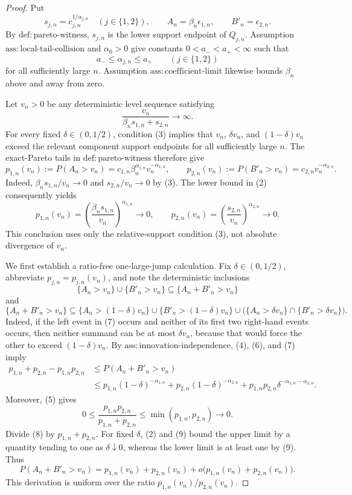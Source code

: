\documentclass{article}
\begin{document}
\begin{proof}
Put
\[
s_{j,n}=c_{j,n}^{1/\alpha_{j,n}}\quad(j\in\{1,2\}),
\qquad A_n=\beta_n\epsilon_{1,n},
\qquad B'_n=\epsilon_{2,n}.
\tag{1}
\]
By \(\mathrm{def{:}pareto\text{-}witness}\), \(s_{j,n}\) is the lower support endpoint of \(Q_{j,n}\). Assumption \(\mathrm{ass{:}local\text{-}tail\text{-}collision}\) and \(\alpha_0>0\) give constants \(0<a_-<a_+<\infty\) such that
\[
a_-\leq\alpha_{j,n}\leq a_+
\qquad(j\in\{1,2\})
\tag{2}
\]
for all sufficiently large \(n\). Assumption \(\mathrm{ass{:}coefficient\text{-}limit}\) likewise bounds \(\beta_n\) above and away from zero.

Let \(v_n>0\) be any deterministic level sequence satisfying
\[
\frac{v_n}{\beta_ns_{1,n}+s_{2,n}}\to\infty.
\tag{3}
\]
For every fixed \(\delta\in(0,1/2)\), condition (3) implies that \(v_n\), \(\delta v_n\), and \((1-\delta)v_n\) exceed the relevant component support endpoints for all sufficiently large \(n\). The exact-Pareto tails in \(\mathrm{def{:}pareto\text{-}witness}\) therefore give
\[
p_{1,n}(v_n):=P(A_n>v_n)
=c_{1,n}\beta_n^{\alpha_{1,n}}v_n^{-\alpha_{1,n}},
\qquad
p_{2,n}(v_n):=P(B'_n>v_n)
=c_{2,n}v_n^{-\alpha_{2,n}}.
\tag{4}
\]
Indeed, \(\beta_ns_{1,n}/v_n\to0\) and \(s_{2,n}/v_n\to0\) by (3). The lower bound in (2) consequently yields
\[
p_{1,n}(v_n)=\left(\frac{\beta_ns_{1,n}}{v_n}\right)^{\alpha_{1,n}}\to0,
\qquad
p_{2,n}(v_n)=\left(\frac{s_{2,n}}{v_n}\right)^{\alpha_{2,n}}\to0.
\tag{5}
\]
This conclusion uses only the relative-support condition (3), not absolute divergence of \(v_n\).

We first establish a ratio-free one-large-jump calculation. Fix \(\delta\in(0,1/2)\), abbreviate \(p_{j,n}=p_{j,n}(v_n)\), and note the deterministic inclusions
\[
\{A_n>v_n\}\cup\{B'_n>v_n\}
\subseteq\{A_n+B'_n>v_n\}
\tag{6}
\]
and
\[
\{A_n+B'_n>v_n\}
\subseteq
\{A_n>(1-\delta)v_n\}\cup\{B'_n>(1-\delta)v_n\}
\cup\bigl(\{A_n>\delta v_n\}\cap\{B'_n>\delta v_n\}\bigr).
\tag{7}
\]
Indeed, if the left event in (7) occurs and neither of its first two right-hand events occurs, then neither summand can be at most \(\delta v_n\), because that would force the other to exceed \((1-\delta)v_n\). By \(\mathrm{ass{:}innovation\text{-}independence}\), (4), (6), and (7) imply
\[
\begin{split}
p_{1,n}+p_{2,n}-p_{1,n}p_{2,n}
&\leq P(A_n+B'_n>v_n)\\
&\leq p_{1,n}(1-\delta)^{-\alpha_{1,n}}
+p_{2,n}(1-\delta)^{-\alpha_{2,n}}
+p_{1,n}p_{2,n}\delta^{-\alpha_{1,n}-\alpha_{2,n}}.
\end{split}
\tag{8}
\]
Moreover, (5) gives
\[
0\leq\frac{p_{1,n}p_{2,n}}{p_{1,n}+p_{2,n}}
\leq\min(p_{1,n},p_{2,n})\to0.
\tag{9}
\]
Divide (8) by \(p_{1,n}+p_{2,n}\). For fixed \(\delta\), (2) and (9) bound the upper limit by a quantity tending to one as \(\delta\downarrow0\), whereas the lower limit is at least one by (9). Thus
\[
P(A_n+B'_n>v_n)
=p_{1,n}(v_n)+p_{2,n}(v_n)
+o\bigl(p_{1,n}(v_n)+p_{2,n}(v_n)\bigr).
\tag{10}
\]
This derivation is uniform over the ratio \(p_{1,n}(v_n)/p_{2,n}(v_n)\).


\end{proof}
\end{document}
